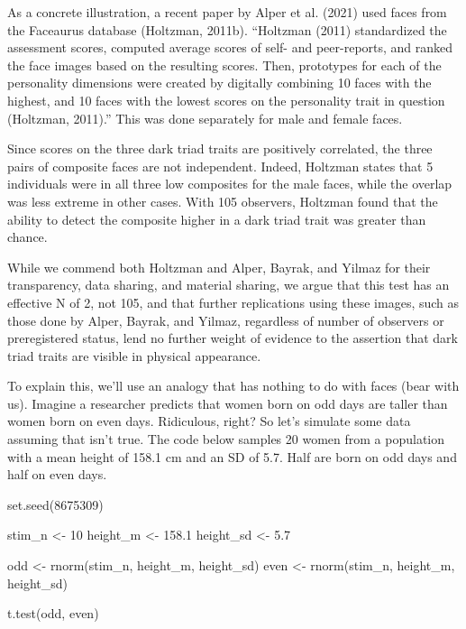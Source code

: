 \documentclass[
  doc,floatsintext]{apa6}
\newenvironment{Shaded}{\begin{snugshade}}{\end{snugshade}}
\newcommand{\DecValTok}[1]{\textcolor[rgb]{0.00,0.00,0.81}{#1}}
\newcommand{\FloatTok}[1]{\textcolor[rgb]{0.00,0.00,0.81}{#1}}
\newcommand{\FunctionTok}[1]{\textcolor[rgb]{0.00,0.00,0.00}{#1}}
\newcommand{\NormalTok}[1]{#1}
\newcommand{\OtherTok}[1]{\textcolor[rgb]{0.56,0.35,0.01}{#1}}
\begin{document}
As a concrete illustration, a recent paper by Alper et al. (2021) used faces from the Faceaurus database (Holtzman, 2011b). ``Holtzman (2011) standardized the assessment scores, computed average scores of self- and peer-reports, and ranked the face images based on the resulting scores. Then, prototypes for each of the personality dimensions were created by digitally combining 10 faces with the highest, and 10 faces with the lowest scores on the personality trait in question (Holtzman, 2011).'' This was done separately for male and female faces.

Since scores on the three dark triad traits are positively correlated, the three pairs of composite faces are not independent. Indeed, Holtzman states that 5 individuals were in all three low composites for the male faces, while the overlap was less extreme in other cases. With 105 observers, Holtzman found that the ability to detect the composite higher in a dark triad trait was greater than chance.

While we commend both Holtzman and Alper, Bayrak, and Yilmaz for their transparency, data sharing, and material sharing, we argue that this test has an effective N of 2, not 105, and that further replications using these images, such as those done by Alper, Bayrak, and Yilmaz, regardless of number of observers or preregistered status, lend no further weight of evidence to the assertion that dark triad traits are visible in physical appearance.

To explain this, we'll use an analogy that has nothing to do with faces (bear with us). Imagine a researcher predicts that women born on odd days are taller than women born on even days. Ridiculous, right? So let's simulate some data assuming that isn't true. The code below samples 20 women from a population with a mean height of 158.1 cm and an SD of 5.7. Half are born on odd days and half on even days.

\begin{Shaded}
\begin{Highlighting}[]
\FunctionTok{set.seed}\NormalTok{(}\DecValTok{8675309}\NormalTok{)}

\NormalTok{stim\_n }\OtherTok{\textless{}{-}} \DecValTok{10}
\NormalTok{height\_m }\OtherTok{\textless{}{-}} \FloatTok{158.1}
\NormalTok{height\_sd }\OtherTok{\textless{}{-}} \FloatTok{5.7}

\NormalTok{odd }\OtherTok{\textless{}{-}} \FunctionTok{rnorm}\NormalTok{(stim\_n, height\_m, height\_sd)}
\NormalTok{even }\OtherTok{\textless{}{-}} \FunctionTok{rnorm}\NormalTok{(stim\_n, height\_m, height\_sd)}

\FunctionTok{t.test}\NormalTok{(odd, even)}
\end{Highlighting}
\end{Shaded}
\end{document}
